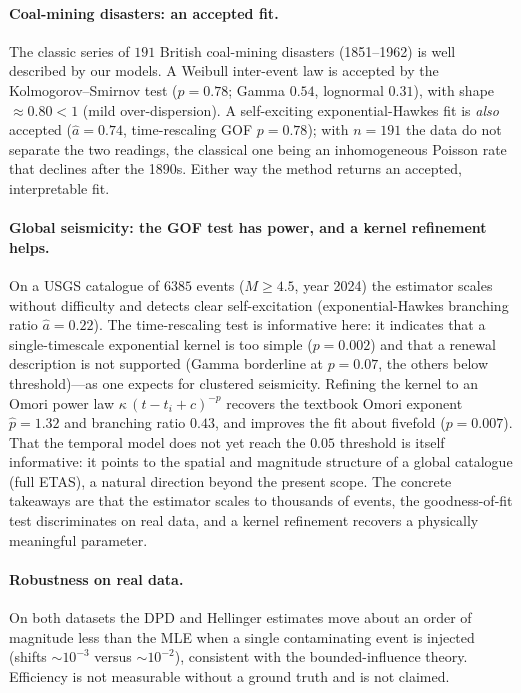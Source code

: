 \documentclass[11pt]{article}
\begin{document}
\paragraph{Coal-mining disasters: an accepted fit.}
The classic series of $191$ British coal-mining disasters (1851--1962) is well
described by our models. A Weibull inter-event law is accepted by the
Kolmogorov--Smirnov test ($p=0.78$; Gamma $0.54$, lognormal $0.31$), with shape
$\approx0.80<1$ (mild over-dispersion). A self-exciting exponential-Hawkes fit is
\emph{also} accepted ($\hat a=0.74$, time-rescaling GOF $p=0.78$); with $n=191$ the
data do not separate the two readings, the classical one being an inhomogeneous
Poisson rate that declines after the 1890s. Either way the method returns an
accepted, interpretable fit.

\paragraph{Global seismicity: the GOF test has power, and a kernel refinement helps.}
On a USGS catalogue of $6385$ events ($M\ge4.5$, year 2024) the estimator scales
without difficulty and detects clear self-excitation (exponential-Hawkes branching
ratio $\hat a=0.22$). The time-rescaling test is informative here: it indicates that a
single-timescale exponential kernel is too simple ($p=0.002$) and that a renewal
description is not supported (Gamma borderline at $p=0.07$, the others below
threshold)---as one expects for clustered seismicity. Refining the kernel to an Omori
power law $\kappa\,(t-t_i+c)^{-p}$ recovers the textbook Omori exponent $\hat p=1.32$
and branching ratio $0.43$, and improves the fit about fivefold ($p=0.007$). That the
temporal model does not yet reach the $0.05$ threshold is itself informative: it points
to the spatial and magnitude structure of a global catalogue (full ETAS), a natural
direction beyond the present scope. The concrete takeaways are that the estimator
scales to thousands of events, the goodness-of-fit test discriminates on real data, and
a kernel refinement recovers a physically meaningful parameter.

\paragraph{Robustness on real data.}
On both datasets the DPD and Hellinger estimates move about an order of magnitude
less than the MLE when a single contaminating event is injected (shifts $\sim10^{-3}$
versus $\sim10^{-2}$), consistent with the bounded-influence theory. Efficiency is
not measurable without a ground truth and is not claimed.
\end{document}
